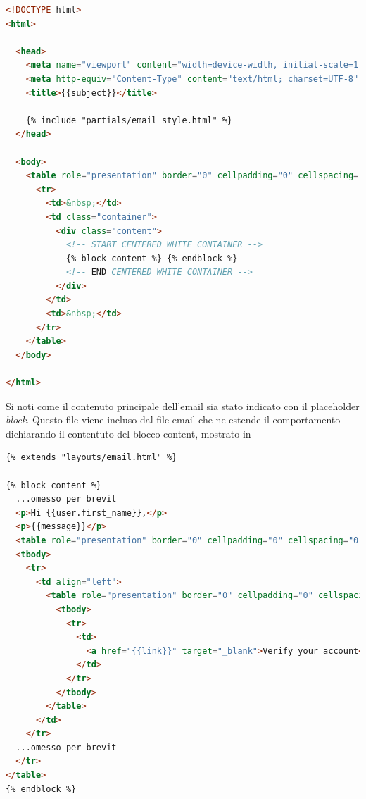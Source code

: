 \documentclass{article}
\begin{document}
\begin{lstlisting}[language=html, style=boxed, label={lst:email-template}, captionpos=b,caption={Layout email utilizzato}]
<!DOCTYPE html>
<html>

  <head>
    <meta name="viewport" content="width=device-width, initial-scale=1.0" />
    <meta http-equiv="Content-Type" content="text/html; charset=UTF-8" />
    <title>{{subject}}</title>

    {% include "partials/email_style.html" %}
  </head>

  <body>
    <table role="presentation" border="0" cellpadding="0" cellspacing="0" class="body">
      <tr>
        <td>&nbsp;</td>
        <td class="container">
          <div class="content">
            <!-- START CENTERED WHITE CONTAINER -->
            {% block content %} {% endblock %}
            <!-- END CENTERED WHITE CONTAINER -->
          </div>
        </td>
        <td>&nbsp;</td>
      </tr>
    </table>
  </body>

</html>

\end{lstlisting}
Si noti come il contenuto principale dell'email sia stato indicato con il placeholder \textit{block}. 
Questo file viene incluso dal file email che ne estende il comportamento dichiarando il contentuto 
del blocco content, mostrato in 

\begin{lstlisting}[language=html, style=boxed, label={lst:content-email-template}, captionpos=b,caption={Corpo dell'email utilizzato}]
{% extends "layouts/email.html" %}

{% block content %}
  ...omesso per brevit
  <p>Hi {{user.first_name}},</p>
  <p>{{message}}</p>
  <table role="presentation" border="0" cellpadding="0" cellspacing="0" class="btn btn-primary">
  <tbody>
    <tr>
      <td align="left">
        <table role="presentation" border="0" cellpadding="0" cellspacing="0">
          <tbody>
            <tr>
              <td>
                <a href="{{link}}" target="_blank">Verify your account</a>
              </td>
            </tr>
          </tbody>
        </table>
      </td>
    </tr>
  ...omesso per brevit
  </tr>
</table>
{% endblock %}

\end{lstlisting}
\end{document}
